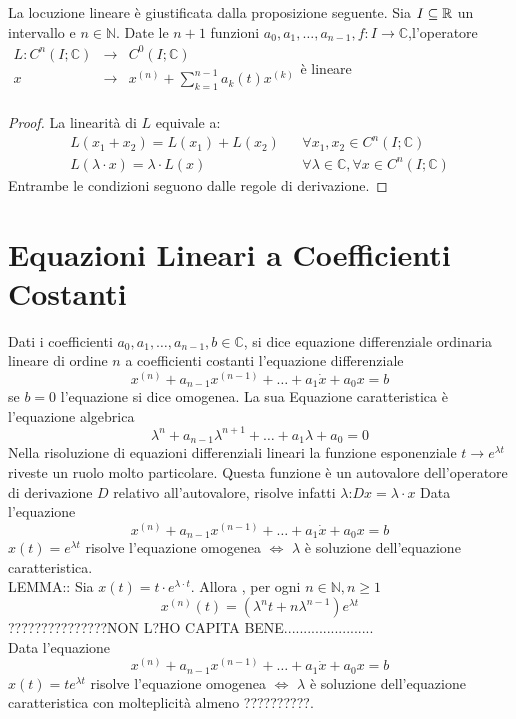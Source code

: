 \observation
La locuzione lineare è giustificata dalla proposizione seguente.
\proposition
Sia $I\subseteq \mathbb{R}$ un intervallo e $n\in\mathbb{N}$. Date le $n+1$ funzioni $a_0,a_1,\ldots,a_{n-1},f:I\to\mathbb{C}$,l'operatore 
$\begin{array}{rcl} 
L: C^n(I;\mathbb{C}) & \to & C^0(I;\mathbb{C}) \\
x & \to & x^{(n)}+\sum\limits_{k=1}^{n-1}a_k(t)x^{(k)} \\ 
\end{array}$è lineare
\begin{proof}
	La linearità di $L$ equivale a:
	$$ \begin{matrix}L(x_1+x_2)=L(x_1)+L(x_2) && \forall x_1,x_2\in C^n(I;\mathbb{C})\\L(\lambda\cdot x)=\lambda\cdot L(x) && \forall\lambda\in\mathbb{C}, \forall x\in C^n(I;\mathbb{C})\end{matrix} $$
	Entrambe le condizioni  seguono dalle regole di derivazione.
\end{proof}
\section{Equazioni Lineari a Coefficienti Costanti}
Dati i coefficienti $a_0,a_1,\ldots,a_{n-1},b\in\mathbb{C}$, si dice equazione differenziale ordinaria lineare di ordine $n$ a coefficienti costanti l'equazione differenziale
$$x^{(n)}+a_{n-1}x^{(n-1)}+\ldots+a_1\dot{x}+a_0x=b$$
se $b=0$ l'equazione si dice omogenea. La sua Equazione caratteristica è l'equazione algebrica
$$\lambda^n+a_{n-1}\lambda^{n+1}+\ldots+a_1\lambda+a_0=0$$ 
\observation
Nella risoluzione di equazioni differenziali lineari la funzione esponenziale $t\to e^{\lambda t}$ riveste un ruolo molto particolare. Questa funzione è un autovalore dell'operatore di derivazione $D$ relativo all'autovalore, risolve infatti $\lambda$:$Dx=\lambda\cdot x$ 
\proposition
Data l'equazione
$$x^{(n)}+a_{n-1}x^{(n-1)}+\ldots+a_1\dot{x}+a_0x=b$$
$x(t)=e^{\lambda t}$ risolve l'equazione omogenea $\Leftrightarrow$ $\lambda$ è soluzione dell'equazione caratteristica.\\

LEMMA:: Sia $x(t)=t\cdot e^{\lambda\cdot t}$. Allora , per ogni $n\in\mathbb{N}, n\ge 1$
$$x^{(n)}(t)=\left(\lambda^nt+n\lambda^{n-1}\right)e^{\lambda t}$$
???????????????NON L?HO CAPITA BENE.......................\\
\proposition
Data l'equazione 
$$x^{(n)}+a_{n-1}x^{(n-1)}+\ldots+a_1\dot{x}+a_0x=b$$
$x(t)=te^{\lambda t}$ risolve l'equazione omogenea $\Leftrightarrow$ $\lambda$ è soluzione dell'equazione caratteristica con molteplicità almeno ??????????.






